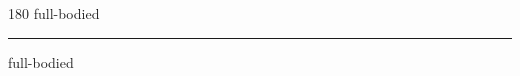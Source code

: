 
\begin{frame}
\begin{center}
\begin{turn}{180}
{\fontsize{2.5cm}{1em}\selectfont full-bodied}
\end{turn}
\vspace{1em}\par  
\hrule
\vspace{1em}\par  
{\fontsize{2.5cm}{1em}\selectfont full-bodied}
\end{center}
\end{frame}
